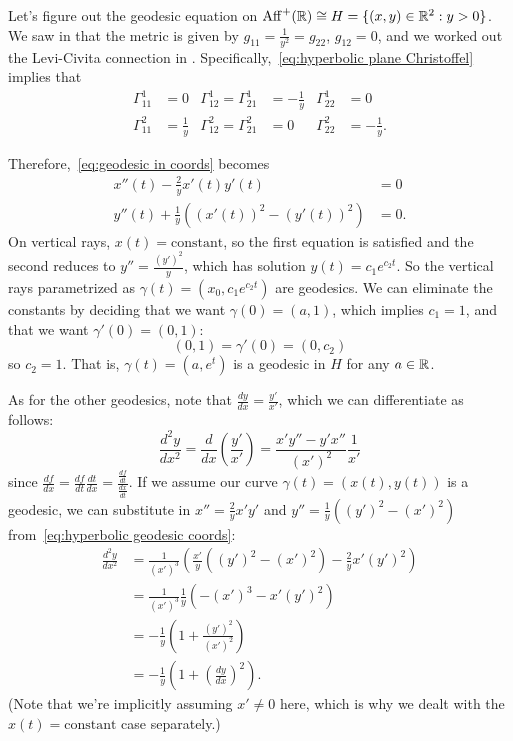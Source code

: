 \begin{example}\label{ex:affine geodesics}
	Let's figure out the geodesic equation on $\operatorname{Aff}^+(\mathbb{R}) \cong H = \{(x,y) \in \mathbb{R}^2 : y > 0\}$. We saw in  that the metric is given by $g_{11} = \frac{1}{y^2} = g_{22}$, $g_{12} = 0$, and we worked out the Levi-Civita connection in . Specifically,~\eqref{eq:hyperbolic plane Christoffel} implies that
	\begin{align*}
		\Gamma_{11}^1 & = 0 & \Gamma_{12}^1 = \Gamma_{21}^1 & = -\frac{1}{y} &  \Gamma_{22}^1 & = 0 \\
		\Gamma_{11}^2 & = \frac{1}{y} & \Gamma_{12}^2 = \Gamma_{21}^2 & = 0 & \Gamma_{22}^2 & = -\frac{1}{y}.
	\end{align*}
	
	Therefore,~\eqref{eq:geodesic in coords} becomes
	\begin{align}\label{eq:hyperbolic geodesic coords}
		x''(t) - \frac{2}{y} x'(t)y'(t) & = 0 \\
		y''(t) + \frac{1}{y}((x'(t))^2 - (y'(t))^2) & = 0. \nonumber
	\end{align}
	On vertical rays, $x(t) = \text{constant}$, so the first equation is satisfied and the second reduces to $y''= \frac{(y')^2}{y}$, which has solution $y(t) = c_1 e^{c_2t}$. So the vertical rays parametrized as $\gamma(t) = (x_0,c_1e^{c_2t})$ are geodesics. We can eliminate the constants by deciding that we want $\gamma(0) = (a,1)$, which implies $c_1 = 1$, and that we want $\gamma'(0) = (0,1)$:
	\[
		(0,1) = \gamma'(0) = (0,c_2)
	\]
	so $c_2 = 1$. That is, $\gamma(t) = (a,e^t)$ is a geodesic in $H$ for any $a \in \mathbb{R}$.
	
	As for the other geodesics, note that $\frac{dy}{dx} = \frac{y'}{x'}$, which we can differentiate as follows:
	\[
		\frac{d^2 y}{dx^2} = \frac{d}{dx} \left( \frac{y'}{x'} \right) =\frac{x'y'' - y'x''}{(x')^2} \frac{1}{x'}
	\]
	since $\frac{df}{dx} = \frac{df}{dt} \frac{dt}{dx} = \frac{\frac{df}{dt}}{\frac{dx}{dt}}$. If we assume our curve $\gamma(t) = (x(t),y(t))$ is a geodesic, we can substitute in $x'' = \frac{2}{y} x'y'$ and $y'' = \frac{1}{y} ((y')^2 - (x')^2)$ from~\eqref{eq:hyperbolic geodesic coords}:
	\begin{align*}
		\frac{d^2 y}{dx^2} & = \frac{1}{(x')^3}\left(\frac{x'}{y}((y')^2-(x')^2) - \frac{2}{y}x'(y')^2\right) \\
		& = \frac{1}{(x')^3}\frac{1}{y}\left(-(x')^3 - x'(y')^2\right) \\
		& = -\frac{1}{y} \left(1 + \frac{(y')^2}{(x')^2}\right) \\
		& = -\frac{1}{y} \left(1 + \left( \frac{dy}{dx}\right)^2\right).
	\end{align*}
	(Note that we're implicitly assuming $x' \neq 0$ here, which is why we dealt with the $x(t) = \text{constant}$ case separately.)
	

\end{example}
